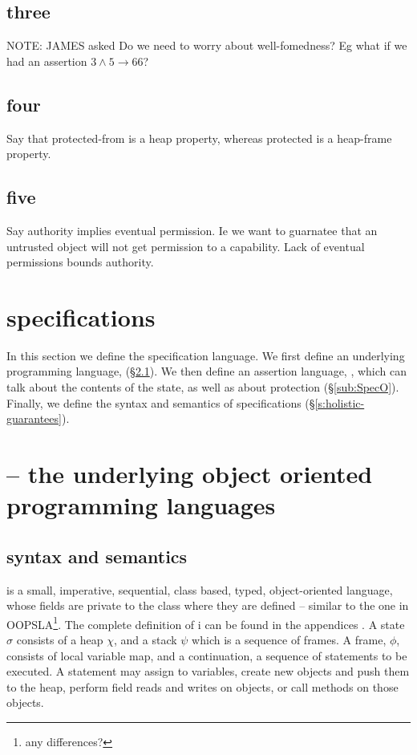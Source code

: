 \subsection{three}
NOTE: JAMES asked Do we need to worry about well-fomedness? Eg what if we had an assertion $3 \wedge 5 \rightarrow 66$?

\subsection{four}
Say that protected-from is a heap property, whereas protected is a heap-frame property.

\subsection{five}
Say authority implies eventual permission. Ie we want to guarnatee that an untrusted object will not get permission to a capability. Lack of eventual permissions bounds authority.


\section{\SpecLang specifications}
\label{s:semantics}

 
In this section we define {the}  \SpecLang specification language.  
We first define an underlying programming language, \LangOO (\S \ref{sub:Loo}).
We then define an assertion language, \AssertLang, which can talk about the
contents of the state, as well as about protection (\S \ref{sub:SpecO}).  Finally, we define the syntax and
semantics of  \SpecLang
specifications (\S \ref{s:holistic-guarantees}).

 


\section{\LangOO -- the underlying object oriented programming languages}

\subsection{\LangOO syntax and semantics}
\label{sub:Loo} 
 \LangOO  is a {small}, imperative, sequential, 
class based, typed, object-oriented language, whose
fields are private to the class where they are defined -- similar to the one in OOPSLA\footnote{any differences?}.
The complete definition of \LangOO i 
{can be found in the appendices  \cite{necessityFull}.}
 A \LangOO state $\sigma$ consists of a 
heap $\chi$, and a  {stack $\psi$ which is a sequence of frames}.
A frame, $\phi$, consists of
local variable map, and a continuation, \ie a sequence of statements to be executed.
 A statement may assign to variables, create new objects and push them to the heap, 
perform field reads and writes on objects,  or
 call methods on those objects. 

